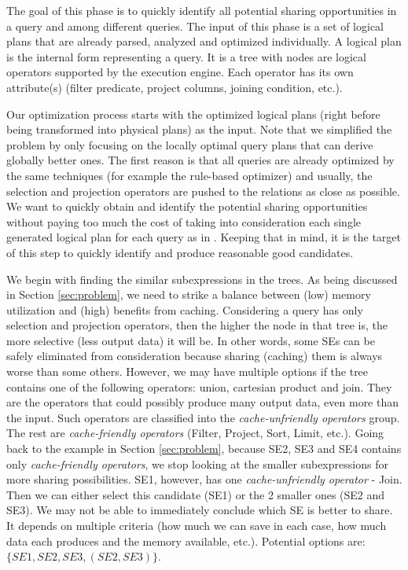 The goal of this phase is to quickly identify all potential sharing opportunities in a query and among different queries. The input of this phase is a set of logical plans that are already parsed, analyzed and optimized individually. A logical plan is the internal form representing a query. It is a tree with nodes are logical operators supported by the execution engine. Each operator has its own attribute(s) (filter predicate, project columns, joining condition, etc.).

Our optimization process starts with the optimized logical plans (right before being transformed into physical plans) as the input. Note that we simplified the problem by only focusing on the locally optimal query plans that can derive globally better ones. The first reason is that all queries are already optimized by the same techniques (for example the rule-based optimizer) and usually, the selection and projection operators are pushed to the relations as close as possible. We want to quickly obtain and identify the potential sharing opportunities without paying too much the cost of taking into consideration each single generated logical plan for each query as in \cite{zhou2007efficient}. Keeping that in mind, it is the target of this step to quickly identify and produce reasonable good candidates.

We begin with finding the similar subexpressions in the trees. As being discussed in Section \ref{sec:problem}, we need to strike a balance between (low) memory utilization and (high) benefits from caching. Considering a query has only selection and projection operators, then the higher the node in that tree is, the more selective (less output data) it will be. In other words, some SEs can be safely eliminated from consideration because sharing (caching) them is always worse than some others. However, we may have multiple options if the tree contains one of the following operators: union, cartesian product and join. They are the operators that could possibly produce many output data, even more than the input. Such operators are classified into the \emph{cache-unfriendly operators} group. The rest are \emph{cache-friendly operators} (Filter, Project, Sort, Limit, etc.). Going back to the example in Section \ref{sec:problem}, because SE2, SE3 and SE4 contains only \emph{cache-friendly operators}, we stop looking at the smaller subexpressions for more sharing possibilities. SE1, however, has one \emph{cache-unfriendly operator} - Join. Then we can either select this candidate (SE1) or the 2 smaller ones (SE2 and SE3). We may not be able to immediately conclude which SE is better to share. It depends on multiple criteria (how much we can save in each case, how much data each produces and the memory available, etc.). Potential options are: $\{SE1, SE2, SE3, (SE2, SE3)\}$.

